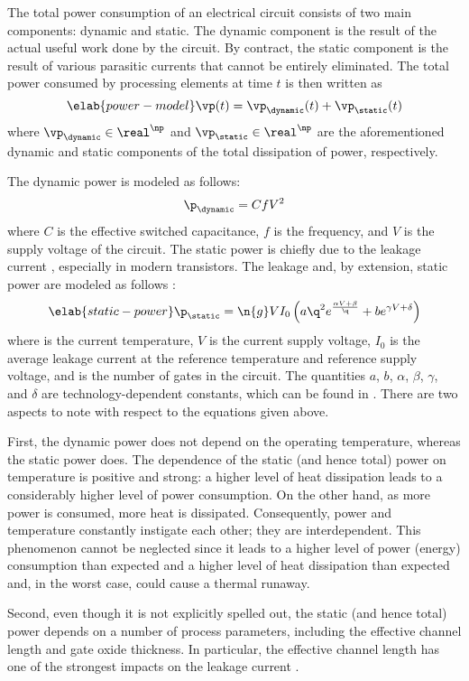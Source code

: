 The total power consumption of an electrical circuit consists of two main
components: dynamic and static. The dynamic component is the result of the
actual useful work done by the circuit. By contract, the static component is the
result of various parasitic currents that cannot be entirely eliminated. The
total power consumed by \np processing elements at time $t$ is then written as
\begin{equation} \elab{power-model}
  \vp(t) = \vp_\dynamic(t) + \vp_\static(t)
\end{equation}
where $\vp_\dynamic \in \real^\np$ and $\vp_\static \in \real^\np$ are the
aforementioned dynamic and static components of the total dissipation of power,
respectively.

The dynamic power is modeled as follows:
\[
  \p_\dynamic = C f V^2
\]
where $C$ is the effective switched capacitance, $f$ is the frequency, and $V$
is the supply voltage of the circuit. The static power is chiefly due to the
leakage current \cite{chandrakasan2000, srivastava2010, juan2011, juan2012},
especially in modern  transistors. The leakage and, by extension,
static power are modeled as follows \cite{liao2005}:
\begin{equation} \elab{static-power}
  \p_\static = \n{g} V I_0 \left(a \q^2 e^{\frac{\alpha V + \beta}{\q}} + b e^{\gamma V + \delta}\right)
\end{equation}
where \q is the current temperature, $V$ is the current supply voltage, $I_0$ is
the average leakage current at the reference temperature and reference supply
voltage, and  is the number of gates in the circuit. The quantities $a$,
$b$, $\alpha$, $\beta$, $\gamma$, and $\delta$ are technology-dependent
constants, which can be found in \cite{liao2005}. There are two aspects to note
with respect to the equations given above.

First, the dynamic power does not depend on the operating temperature, whereas
the static power does. The dependence of the static (and hence total) power on
temperature is positive and strong: a higher level of heat dissipation leads to
a considerably higher level of power consumption. On the other hand, as more
power is consumed, more heat is dissipated. Consequently, power and temperature
constantly instigate each other; they are interdependent. This phenomenon cannot
be neglected since it leads to a higher level of power (energy) consumption than
expected and a higher level of heat dissipation than expected and, in the worst
case, could cause a thermal runaway.

Second, even though it is not explicitly spelled out, the static (and hence
total) power depends on a number of process parameters, including the effective
channel length and gate oxide thickness. In particular, the effective channel
length has one of the strongest impacts on the leakage current \cite{juan2012}.
